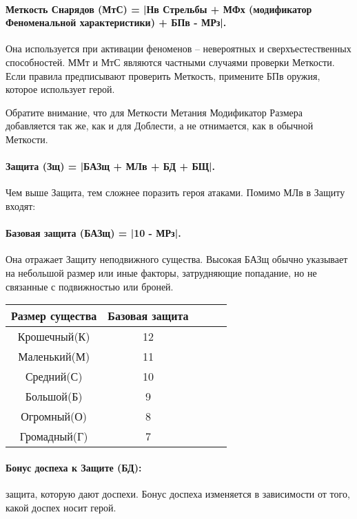 \paragraph{Меткость Снарядов (МтС) = |Нв Стрельбы + МФх (модификатор Феноменальной характеристики) + БПв - МРз|.} Она используется при активации феноменов – невероятных и сверхъестественных способностей.
\newline ММт и МтС являются частными случаями проверки Меткости. Если правила предписывают проверить Меткость, примените БПв оружия, которое использует герой.
\begin{tcolorbox}
	Обратите внимание, что для Меткости Метания Модификатор Размера добавляется так же, как и для Доблести, а не отнимается, как в обычной Меткости.
\end{tcolorbox}
\paragraph{Защита (Зщ) = |БАЗщ + МЛв + БД + БЩ|.} Чем выше Защита, тем сложнее поразить героя атаками. Помимо МЛв в Защиту входят:
\paragraph{Базовая защита (БАЗщ) = |10 - МРз|.} Она отражает Защиту неподвижного существа. Высокая БАЗщ обычно указывает на небольшой размер или иные факторы, затрудняющие попадание, но не связанные с подвижностью или броней. 
\begin{center}
    \begin{tabular}{ |c|c|c|c|c| }
        \hline
        Размер существа & Базовая защита
        \\ \hline
        Крошечный(К) & 12
        \\ \hline
        Маленький(М) & 11
        \\ \hline
        Средний(С) & 10
        \\ \hline
        Большой(Б) & 9
        \\ \hline
        Огромный(О) & 8
        \\ \hline
        Громадный(Г) & 7
        \\ \hline
    \end{tabular}
\end{center}

\paragraph{Бонус доспеха к Защите (БД):} защита, которую дают доспехи. Бонус доспеха изменяется в зависимости от того, какой доспех носит герой.
